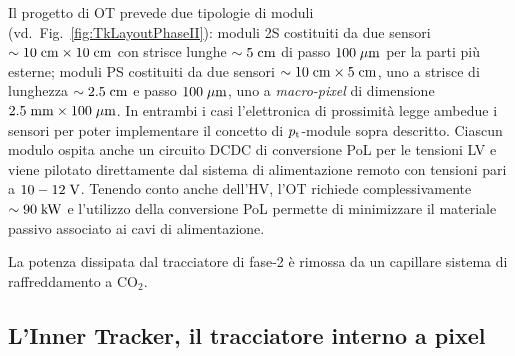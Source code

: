 Il progetto di OT prevede due tipologie di moduli (vd.~Fig.~\ref{fig:TkLayoutPhaseII}): moduli 2S costituiti da due sensori $\sim10\rm \; cm\times10\rm \; cm$ con strisce lunghe $\sim5\rm \; cm$ di passo $100\; \mu \rm m$ per la parti pi\`u esterne; moduli PS costituiti da due sensori $\sim10\rm \; cm\times5\rm \; cm$, uno a strisce di lunghezza $\sim2.5\rm \; cm$ e passo $100\; \mu \rm m$, uno a {\em macro-pixel} di dimensione $2.5\rm \; mm\times100\; \mu \rm m$. In entrambi i casi l'elettronica di prossimit\`a legge ambedue i sensori per poter implementare il concetto di ${p_{\rm t}}$-module sopra descritto. Ciascun modulo ospita anche un circuito DCDC di conversione PoL per le tensioni LV e viene pilotato direttamente dal sistema di alimentazione remoto con tensioni pari a $10-12\rm \; V$. Tenendo conto anche dell'HV, l'OT richiede complessivamente $\sim90\rm \; kW$ e l'utilizzo della conversione PoL permette di minimizzare il materiale passivo associato ai cavi di alimentazione.

La potenza dissipata dal tracciatore di fase-2 \`e rimossa da un capillare sistema di raffreddamento a CO$_2$.



%
%


\subsection{L'Inner Tracker, il tracciatore interno a pixel}

